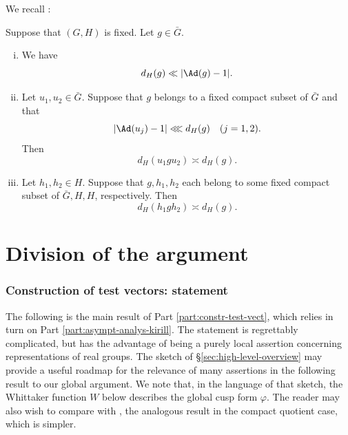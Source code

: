 We recall \cite[Lemma 4.1]{2020arXiv201202187N}:
\begin{lemma}
  Suppose that $(G,H)$ is fixed.  Let $g \in \bar{G}$.
  \begin{enumerate}[(i)]
  \item We have
    \begin{equation}\label{eqn:d-H-Z-vs-dist-G-mod-Z}
      d_{H}(g) \ll |\Ad(g)-1|.
    \end{equation}
  \item
    Let $u_1, u_2 \in \bar{G}$.
    Suppose that $g$
    belongs to a fixed compact subset of $\bar{G}$
    and that
    \[
      |\Ad(u_j)-1| \lll
      d_{H}(g)
      \quad (j=1,2).
    \]
    Then
    \begin{equation}\label{eqn:d-H-Z-compare-u-g-g}
      d_{H}(u_1 g u_2) \asymp d_{H}(g).
    \end{equation}
  \item Let $h_1, h_2 \in H$.  Suppose that $g,h_1,h_2$
    each belong to some fixed compact subset of $\bar{G},H,H$, respectively.  Then
    \begin{equation}\label{eqn:d-H-h1gh2}
      d_{H}(h_1 g h_2)
      \asymp d_{H}(g).
    \end{equation}
  \end{enumerate}
\end{lemma}

\part{Division of the argument}\label{part:reduction-proof}



\section{Construction of test vectors: statement}\label{sec:20230516081722}
The following is the main result of Part \ref{part:constr-test-vect}, which relies in turn on Part \ref{part:asympt-analys-kirill}.  The statement is regrettably complicated, but has the advantage of being a purely local assertion concerning representations of real groups.  The sketch of \S\ref{sec:high-level-overview} may provide a useful roadmap for the relevance of many assertions in the following result to our global argument.  We note that, in the language of that sketch, the Whittaker function $W$ below describes the global cusp form $\varphi$.  The reader may also wish to compare with \cite[Thm 4.2]{2020arXiv201202187N}, the analogous result in the compact quotient case, which is simpler.

